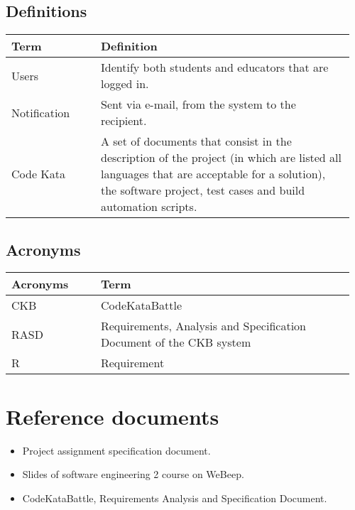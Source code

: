     \subsection{Definitions}
    \begin{center}
	\begin{tabular}{@{}p{0.25\linewidth} p{0.71\linewidth}@{}}
		\toprule
		\textbf{Term} & \textbf{Definition}\\
		\midrule
		Users & Identify both students and educators that are logged in. \\
            Notification & Sent via e-mail, from the system to the recipient. \\
            Code Kata & A set of documents that consist in the description of the project (in which are listed all languages that are acceptable for a solution), the software project, test cases and build automation scripts. \\
		\bottomrule
	\end{tabular}
    \end{center}
    
    \subsection{Acronyms}
    \begin{center}
	\begin{tabular}{@{}p{0.25\linewidth} p{0.71\linewidth}@{}}
		\toprule
		\textbf{Acronyms} & \textbf{Term}\\
		\midrule
		CKB & CodeKataBattle\\
            RASD & Requirements, Analysis and Specification Document of the CKB system\\
            R & Requirement\\
		\bottomrule
	\end{tabular}
    \end{center}
    
\section{Reference documents}
\begin{itemize}
	\item Project assignment specification document.
	\item Slides of software engineering 2 course on WeBeep.
        \item CodeKataBattle, Requirements Analysis and Specification Document. 
\end{itemize}

